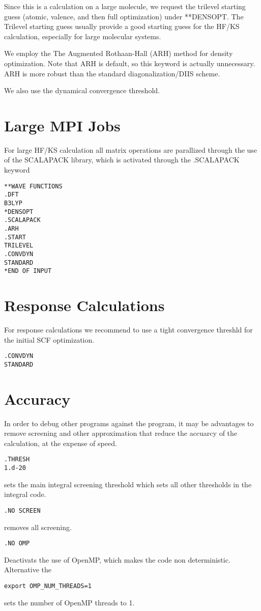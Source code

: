 Since this is a calculation on a large molecule, we request the trilevel starting 
guess\cite{trilevel1, trilevel2} (atomic, valence, and then full optimization) under **DENSOPT. 
The Trilevel starting guess usually provide a good starting guess 
for the HF/KS calculation, especially for large molecular systems. 
 
We employ the The Augmented Rothaan-Hall (ARH) method for density optimization. 
Note that ARH is default, so this keyword is actually unnecessary.
ARH is more robust than the standard diagonalization/DIIS scheme.

We also use the dynamical convergence threshold. 

\section{Large MPI Jobs}

For large HF/KS calculation all matrix operations are parallized through the use of the SCALAPACK library, which is activated through the .SCALAPACK keyword 

\begin{verbatim}
**WAVE FUNCTIONS
.DFT
B3LYP
*DENSOPT
.SCALAPACK
.ARH
.START
TRILEVEL
.CONVDYN
STANDARD
*END OF INPUT
\end{verbatim}

\section{Response Calculations}

For response calculations we recommend to use a tight convergence threshld for the initial SCF optimization. 

\begin{verbatim}
.CONVDYN
STANDARD
\end{verbatim}

\section{Accuracy}

In order to debug other programs against the {\lsdalton} program, it may be advantages to remove screening and other approximation that reduce the accuarcy of the calculation, at the expense of speed.

\begin{verbatim}
.THRESH
1.d-20
\end{verbatim}
sets the main integral screening threshold which sets all other thresholds in the integral code. 
\begin{verbatim}
.NO SCREEN
\end{verbatim}
removes all screening. 
\begin{verbatim}
.NO OMP 
\end{verbatim}
Deactivats the use of OpenMP, which makes the code non deterministic. Alternative the 
\begin{verbatim}
export OMP_NUM_THREADS=1
\end{verbatim}
sets the number of OpenMP threads to 1.

